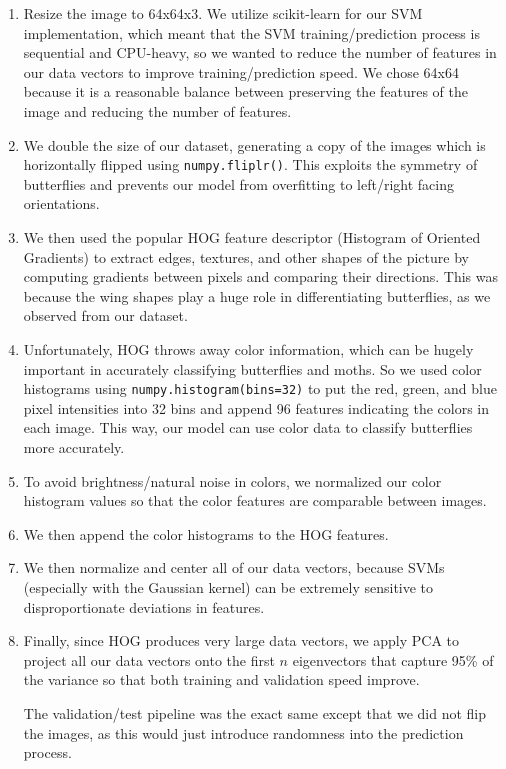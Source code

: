 \documentclass[10pt]{article} %
\begin{document}
\begin{enumerate}
  \item Resize the image to 64x64x3. We utilize scikit-learn for our SVM implementation, which meant that the SVM training/prediction process is sequential and CPU-heavy, so we wanted to reduce the number of features in our data vectors to improve training/prediction speed. We chose 64x64 because it is a reasonable balance between preserving the features of the image and reducing the number of features.
  \item We double the size of our dataset, generating a copy of the images which is horizontally flipped using \texttt{numpy.fliplr()}. This exploits the symmetry of butterflies and prevents our model from overfitting to left/right facing orientations.
  \item We then used the popular HOG feature descriptor (Histogram of Oriented Gradients) to extract edges, textures, and other shapes of the picture by computing gradients between pixels and comparing their directions. This was because the wing shapes play a huge role in differentiating butterflies, as we observed from our dataset.
  \item Unfortunately, HOG throws away color information, which can be hugely important in accurately classifying butterflies and moths. So we used color histograms using \texttt{numpy.histogram(bins=32)} to put the red, green, and blue pixel intensities into 32 bins and append 96 features indicating the colors in each image. This way, our model can use color data to classify butterflies more accurately.
  \item To avoid brightness/natural noise in colors, we normalized our color histogram values so that the color features are comparable between images.
  \item We then append the color histograms to the HOG features.
  \item We then normalize and center all of our data vectors, because SVMs (especially with the Gaussian kernel) can be extremely sensitive to disproportionate deviations in features.
  \item Finally, since HOG produces very large data vectors, we apply PCA to project all our data vectors onto the first $n$ eigenvectors that capture 95\% of the variance so that both training and validation speed improve.

    The validation/test pipeline was the exact same except that we did not flip the images, as this would just introduce randomness into the prediction process.


\end{enumerate}
\end{document}
